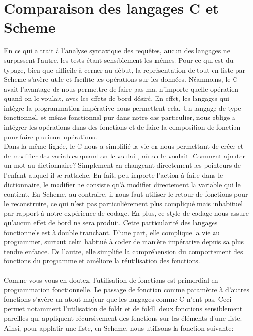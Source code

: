 \documentclass[french]{article}
\begin{document}
		\section{Comparaison des langages C et Scheme}
				En ce qui a trait à l'analyse syntaxique des requêtes, aucun 
				des langages ne surpassent l'autre, les tests étant 
				sensiblement les mêmes. Pour ce qui est du typage, bien que 
				difficile à cerner au début, la représentation de tout en 
				liste par Scheme s'avère utile et facilite les opérations sur 
				les données. Néanmoins, le C avait l'avantage de nous 
				permettre de faire pas mal n'importe quelle opération quand on 
				le voulait, avec les effets de bord désiré. En effet, les 
				langages qui intègre la programmation impérative nous 
				permettent cela. Un langage de type fonctionnel, et même 
				fonctionnel pur 
				dans notre cas particulier, nous oblige a intégrer les 
				opérations dans des fonctions et de faire la composition de 
				fonction pour faire plusieurs opérations.
				\\
				Dans la même lignée, le C nous a simplifié la vie en nous 
				permettant de créer et de modifier des variables quand on le 
				voulait, où on le voulait. Comment ajouter un mot au 
				dictionnaire? Simplement en changeant directement les 
				pointeurs de l'enfant auquel il se rattache. En fait, peu 
				importe l'action à faire  dans le dictionnaire, le modifier ne 
				consiste qu'à modifier directement la variable qui le 
				contient. En Scheme, au contraire, il nous faut utiliser le 
				retour de fonctions pour le reconstruire, ce qui n'est pas 
				particulièrement plus compliqué mais inhabituel par rapport à 
				notre expérience de codage. En plus, ce style de codage nous 
				assure qu'aucun effet de bord ne sera 
				produit. Cette particularité des langages fonctionnels est à 
				double tranchant. D'une part, elle complique la vie au 
				programmer, surtout celui habitué à coder de manière 
				impérative depuis sa plus tendre enfance. De l'autre, elle 
				simplifie la compréhension du comportement des fonctions du 
				programme et améliore la réutilisation des fonctions.\\
				\\
				Comme vous vous en doutez, l'utilisation de fonctions est 
				primordial en programmation fonctionnelle. Le passage de 
				fonction comme paramètre à d'autres fonctions s'avère un atout 
				majeur que les langages comme C n'ont pas. Ceci permet 
				notamment l'utilisation de foldr et de foldl, deux fonctions 
				sensiblement pareilles qui appliquent récursivement des 
				fonctions sur les éléments d'une liste. Ainsi, pour applatir 
				une liste, en Scheme, nous utilisons la fonction suivante:
				\\
				
\end{document}
